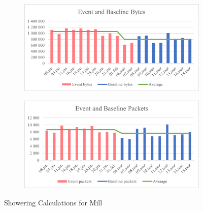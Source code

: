 \begin{figure}[H]
    \centering
    \begin{subfigure}{1\textwidth}
        \centering
        \includegraphics[width=1\hsize]{figures/Mill_Shower_Calculations_Bytes.png} 
    \end{subfigure}
    \begin{subfigure}{1\textwidth}
        \centering
        \includegraphics[width=1\hsize]{figures/Mill_Shower_Calculations_Packets.png} 
    \end{subfigure}
    \caption{Showering Calculations for Mill}
    \label{fig:MillShowerCalculations}
\end{figure}

